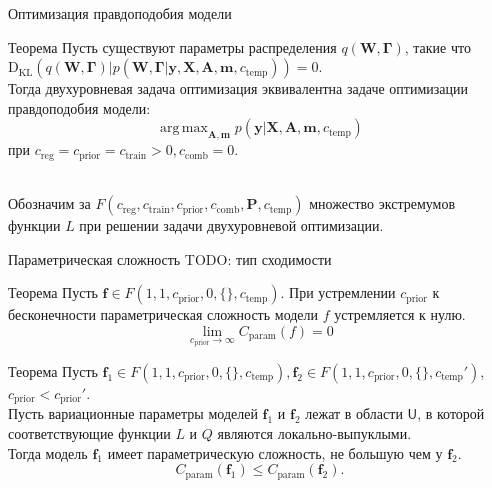 \documentclass[usenames,dvipsnames,11pt,pdf,utf8,russian,aspectratio=169]{beamer}
\DeclareMathOperator*{\argmax}{arg\,max}
\begin{document}
\begin{frame}{Оптимизация правдоподобия модели}
\begin{block}{Теорема}
Пусть существуют параметры распределения $q(\mathbf{W}, \boldsymbol{\Gamma})$, такие что $\text{D}_\text{KL}(q(\mathbf{W}, \boldsymbol{\Gamma})|p(\mathbf{W},  \boldsymbol{\Gamma}| \mathbf{y}, \mathbf{X}, \mathbf{A}, \mathbf{m}, c_\text{temp})) = 0$.\\
Тогда двухуровневая задача оптимизация эквивалентна задаче оптимизации правдоподобия модели:
$$\argmax_{\mathbf{A}, \mathbf{m}}  p(\mathbf{y}|\mathbf{X},\mathbf{A},\mathbf{m}, c_{\text{temp}})$$ 
при $c_{\text{reg}} = c_{\text{prior}} = c_{\text{train}} >0, c_{\text{comb}} = 0$. 
\end{block}
~\\
Обозначим за $F(c_{\text{reg}}, c_{\text{train}}, c_{\text{prior}}, c_{\text{comb}}, \mathbf{P}, c_{\text{temp}})$ множество экстремумов функции $L$ при решении задачи двухуровневой оптимизации.
\end{frame}

\begin{frame}{Параметрическая сложность}
\small
TODO: тип сходимости
\begin{block}{Теорема}
Пусть $\mathbf{f} \in F(1, 1, c_{\text{prior}}, 0, \{\},  c_{\text{temp}} )$.
При устремлении $ c_{\text{prior}}$ к бесконечности параметрическая сложность модели $f$ устремляется к нулю.
\[
    \lim_{c_{\text{prior}} \to \infty} C_{\text{param}}(f) = 0
\]
\end{block}

\begin{block}{Теорема}
Пусть $\mathbf{f}_1 \in F(1, 1, c_{\text{prior}}, 0, \{\},  c_{\text{temp}} ), \mathbf{f}_2 \in F(1, 1, c_{\text{prior}}, 0, \{\},  c_{\text{temp}}' )$, $c_{\text{prior}} < c_{\text{prior}}'$.\\
Пусть вариационные параметры моделей $\mathbf{f}_1$ и $\mathbf{f}_2$ лежат в области $\mathsf{U}$, в которой соответствующие функции $L$ и $Q$ являются локально-выпуклыми.\\ 
Тогда модель $\mathbf{f}_1$ имеет параметрическую сложность, не большую чем у $\mathbf{f}_2$.
\[
    C_\text{param}(\mathbf{f}_1) \leq C_\text{param}(\mathbf{f}_2).
\]
\end{block}


\end{frame}
\end{document}
